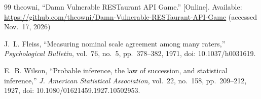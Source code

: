 \documentclass[conference]{IEEEtran}
\begin{document}
\begin{thebibliography}{99}
theowni, ``Damn Vulnerable RESTaurant API Game.'' [Online]. Available: \url{https://github.com/theowni/Damn-Vulnerable-RESTaurant-API-Game} (accessed Nov.~17, 2026)

J.~L. Fleiss, ``Measuring nominal scale agreement among many raters,'' \emph{Psychological Bulletin}, vol.~76, no.~5, pp.~378--382, 1971, doi: 10.1037/h0031619.

E.~B. Wilson, ``Probable inference, the law of succession, and statistical inference,'' \emph{J. American Statistical Association}, vol.~22, no.~158, pp.~209--212, 1927, doi: 10.1080/01621459.1927.10502953.

\end{thebibliography}
\end{document}
